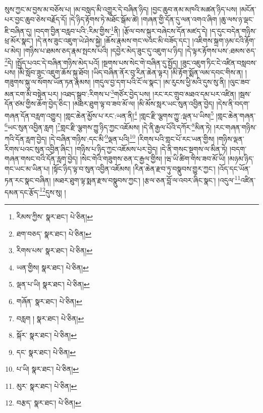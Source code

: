 སུས་ཀྱང་མ་བྱས་མ་བཅོས་པ། །མ་བསླད་མི་འགྱུར་དེ་བཞིན་ཉིད། །བྱང་ཆུབ་ནམ་མཁའི་མཚན་ཉིད་པས། །མངོན་པར་བྱང་ཆུབ་ཅེས་བརྗོད་དོ། །དེ་ཉིད་རྟོགས་ཏེ་མཐོང་སྒོམ་ཚེ། །གཞན་གྱི་དོན་དུ་ལན་འགའ་ཞིག །ཆུ་ལས་ཉ་ལྡང་ཇི་བཞིན་དུ། །བདག་བྱིན་བརླབ་པའི་:རིམ་གྱིས་\footnote{རིམས་ཀྱིས་  སྣར་ཐང་།  པེ་ཅིན། }ནི། །རྩོལ་བས་སྐུར་བཞེངས་དོན་མཛད་དེ། །ད་དུང་བདེན་གཉིས་ཕྲ་མོར་སྣང་། །དེ་ནས་ཟུང་འཇུག་ཡེ་ཤེས་སྐྱེ། །ཆོས་རྣམས་གང་ལའང་མི་བཟོད་དང་། །འཇིགས་སྐྲག་ཉམ་ངའི་རྟོག་པ་མེད། །གཉིས་པ་ཐམས་ཅད་རྣམ་སྤངས་པའི། །དབྱེར་མེད་ཟུང་དུ་འཇུག་པ་ཉིད། །དེ་ལྟར་རྟོགས་པས་:ཐམས་ཅད་\footnote{ཐག་བཅད་  སྣར་ཐང་།  པེ་ཅིན། }དེ། །སྤྱོད་པའང་དེ་བཞིན་གཉིས་མེད་པའོ། །སྔགས་པས་སེང་གེ་བཞིན་དུ་སྤྱོད། །ཟུང་འཇུག་ཏིང་ངེ་འཛིན་བསླབས་པས། །མི་སློབ་ཟུང་འཇུག་ཆོས་སྐུ་ཐོབ། །ཡིད་བཞིན་ནོར་བུ་རིན་ཆེན་ལྟར། །མི་རྟོག་སྨོན་ལམ་དབང་གིས་ན། །གཟུགས་སྐུ་ལ་སོགས་ཡོན་ཏན་རྣམས། །གདུལ་བྱ་དག་པའི་ངོ་ལ་སྣང་། །མ་རུངས་ཕྱི་མའི་དུས་སུ་ནི། །ལུང་ཟབ་མན་ངག་མི་བསྟེན་པར། །འཐད་སྒྲུབ་:རིགས་པ་\footnote{རིགས་པས་  སྣར་ཐང་།  པེ་ཅིན། }གཙོར་བྱེད་པས། །རང་རང་གྲུབ་མཐའ་དམ་པར་འཛིན། །སྦས་དོན་ཙམ་གྱིས་ཆོག་བྱེད་ཅིང་། །མཐར་ཐུག་ལྟ་བ་ཟབ་མོ་ལ། །མི་མོས་སླར་ཡང་སུན་འབྱིན་བྱེད། །དེས་ནི་བདག་གཞན་དོན་བརླག་འགྱུར། །གླང་ཆེན་མྱོས་པ་རང་:ཡན་ནི།\footnote{ཡན་གྱིས།  སྣར་ཐང་།  པེ་ཅིན། } །གླང་རྫི་ལྕགས་ཀྱུ་:ལྡན་པ་ཡིས།\footnote{ལྡན་པ་ཡི།  སྣར་ཐང་།  པེ་ཅིན། } །གླང་ཆེན་གཞན་\footnote{གཞོན་  སྣར་ཐང་།  པེ་ཅིན། }ཡང་སུན་འབྱིན་རླག །\footnote{བརླག །  སྣར་ཐང་།  པེ་ཅིན། }གླང་རྫི་ལྕགས་ཀྱུ་ཉིད་ཀྱང་འཇོམས། །དེ་ནི་རྒྱལ་པོའི་དཀོར་\footnote{སྐོར་  སྣར་ཐང་།  པེ་ཅིན། }མིན་ཏེ། །རང་གཞན་གཉིས་ཀའི་དོན་རླག་བྱེད། །དེ་བཞིན་གཉིས་:དང་མི་\footnote{དང་  སྣར་ཐང་།  པེ་ཅིན། }ལྡན་པའི།\footnote{པ་ཡི།  སྣར་ཐང་།  པེ་ཅིན། } །རིགས་པའི་གླང་པོ་རང་ཡན་གྱིས། །གཉིས་ལྡན་རིགས་པའང་སུན་འབྱིན་ཞིང་། །གཉིས་པ་ཉིད་ཀྱང་འཇོམས་པར་བྱེད། །དེ་ནི་གསང་སྔགས་ལ་མིན་ཏེ། །བདག་གཞན་གསང་བའི་དོན་རླག་བྱེད། །སེང་གེའི་གཟུགས་ཅན་ང་རྒྱལ་གྱིས། །ཝ་ཡི་ཚིག་གིས་ཟབ་མོ་ཡི། །མཉམ་ཉིད་གང་ཡང་མ་ཡིན་པ། །སྟོང་ཉིད་ལྟ་བ་སུན་འབྱིན་འཇོམས། །རིན་ཆེན་རྫབ་ཏུ་བསྣུབས་གྱུར་ཀྱང་། །འོད་དང་ཡོན་ཏན་རང་སྣང་བཞིན། །མཐར་ཐུག་ལྟ་སྨན་རྫས་བསྣུབས་ཀྱང་། །རྩལ་ཅན་བློ་ལ་འབར་ཞིང་སྣང་། །འདུལ་\footnote{མུར་  སྣར་ཐང་།  པེ་ཅིན། }འཛིན་དམན་དང་རྩོད་\footnote{བརྩད་  སྣར་ཐང་།  པེ་ཅིན། }དུས་སུ། །
